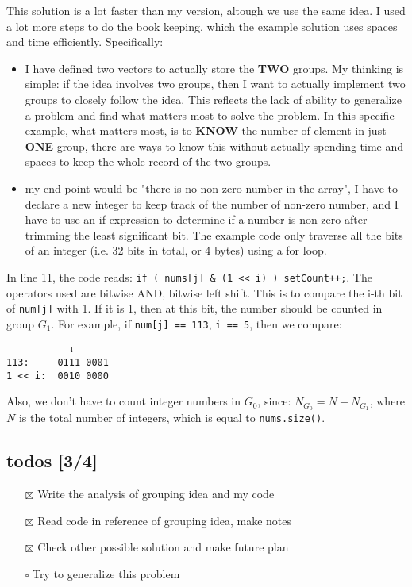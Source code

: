 \documentclass[12pt]{article}
\begin{document}
This solution is a lot faster than my version, altough we use the same idea. I used a lot more steps to do the book keeping, which the example solution uses spaces and time efficiently. Specifically:
\begin{itemize}
\item I have defined two vectors to actually store the \textbf{TWO} groups. My thinking is simple: if the idea involves two groups, then I want to actually implement two groups to closely follow the idea. This reflects the lack of ability to generalize a problem and find what matters most to solve the problem. In this specific example, what matters most, is to \textbf{KNOW} the number of element in just \textbf{ONE} group, there are ways to know this without actually spending time and spaces to keep the whole record of the two groups.
\item my end point would be "there is no non-zero number in the array", I have to declare a new integer to keep track of the number of non-zero number, and I have to use an if expression to determine if a number is non-zero after trimming the least significant bit.  The example code only traverse all the bits of an integer (i.e. 32 bits in total, or 4 bytes) using a for loop.
\end{itemize}

In line 11, the code reads: \texttt{if ( nums[j] \& (1 << i) ) setCount++;}. The operators used are bitwise AND, bitwise left shift. This is to compare the i-th bit of \texttt{num[j]} with 1. If it is 1, then at this bit, the number should be counted in group \(G_1\). For example, if \texttt{num[j] == 113}, \texttt{i == 5}, then we compare:
\begin{verbatim}
           ↓
113:     0111 0001
1 << i:  0010 0000
\end{verbatim}

Also, we don't have to count integer numbers in \(G_0\), since: \(N_{G_0} = N - N_{G_1}\), where \(N\) is the total number of integers, which is equal to \texttt{nums.size()}.

\subsection{todos [3/4]}
\label{sec:orgc97a3d0}
\begin{itemize}
\item[{$\boxtimes$}] Write the analysis of grouping idea and my code
\item[{$\boxtimes$}] Read code in reference of grouping idea, make notes
\item[{$\boxtimes$}] Check other possible solution and make future plan
\item[{$\square$}] Try to generalize this problem
\end{itemize}
\end{document}
